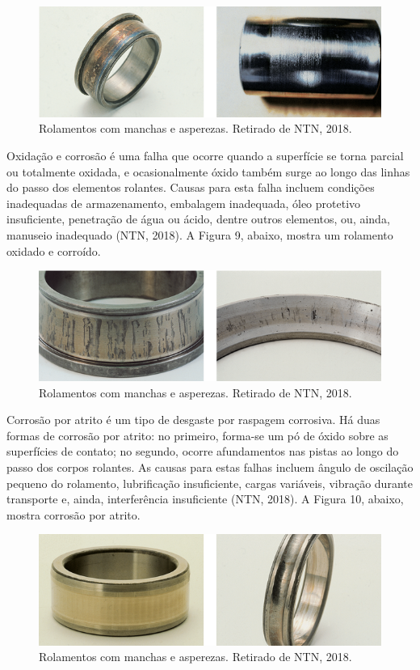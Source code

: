 \documentclass[
	12pt,				
	oneside,			
	a4paper,			
	english,			
	brazil				
	]{abntex2ppgsi}
\begin{document}
\begin{figure}[!htb]
\centering
\includegraphics{Figura8}
\caption {Rolamentos com manchas e asperezas. Retirado de NTN, 2018.}
\label{Figura8}
\end{figure}

Oxidação e corrosão é uma falha que ocorre quando a superfície se torna parcial ou totalmente oxidada, e ocasionalmente óxido também surge ao longo das linhas do passo dos elementos rolantes. Causas para esta falha incluem condições inadequadas de armazenamento, embalagem inadequada, óleo protetivo insuficiente, penetração de água ou ácido, dentre outros elementos, ou, ainda, manuseio inadequado (NTN, 2018). A Figura 9, abaixo, mostra um rolamento oxidado e corroído.

\begin{figure}[!htb]
\centering
\includegraphics{Figura9}
\caption {Rolamentos com manchas e asperezas. Retirado de NTN, 2018.}
\label{Figura9}
\end{figure}

Corrosão por atrito é um tipo de desgaste por raspagem corrosiva. Há duas formas de corrosão por atrito: no primeiro, forma-se um pó de óxido sobre as superfícies de contato; no segundo, ocorre afundamentos nas pistas ao longo do passo dos corpos rolantes. As causas para estas falhas incluem ângulo de oscilação pequeno do rolamento, lubrificação insuficiente, cargas variáveis, vibração durante transporte e, ainda, interferência insuficiente (NTN, 2018). A Figura 10, abaixo, mostra corrosão por atrito.

\begin{figure}[!htb]
\centering
\includegraphics{Figura10}
\caption {Rolamentos com manchas e asperezas. Retirado de NTN, 2018.}
\label{Figura10}
\end{figure}
\end{document}
